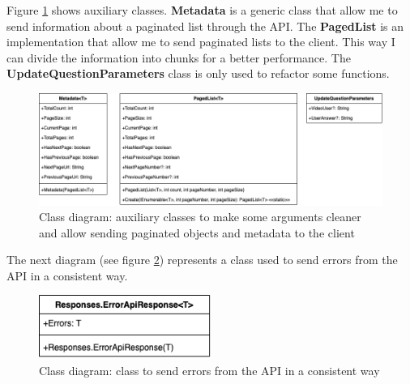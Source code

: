             Figure \ref{fig:implementation_auxiliary} shows auxiliary classes. \textbf{Metadata} is a generic class that allow me to send information about a paginated 
            list through the API. The \textbf{PagedList} is an implementation that allow me to send paginated lists to the client. This way I can divide the information into chunks
            for a better performance. The \textbf{UpdateQuestionParameters} class is only used to refactor some functions.
            \begin{figure}[H]
                \centering
                    \includegraphics[width=\textwidth]{assets/diagrams/auxiliary.png}
                \caption{Class diagram: auxiliary classes to make some arguments cleaner and allow sending paginated objects and metadata to the client}
                \label{fig:implementation_auxiliary}
            \end{figure}

            The next diagram (see figure \ref{fig:implementation_error_response}) represents a class used to send errors from the API in a consistent way. 
            \begin{figure}[H]
                \centering
                    \includegraphics[width=0.5\textwidth]{assets/diagrams/error_response.png}
                \caption{Class diagram: class to send errors from the API in a consistent way}
                \label{fig:implementation_error_response}
            \end{figure}

